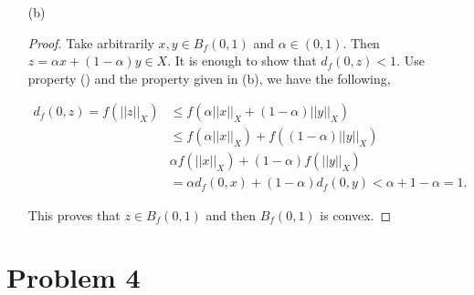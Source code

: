 \documentclass[12pt]{article}
\begin{document}
\begin{enumerate}
\begin{proof}
In conclusion, $(X, d_f)$ is a complete metric space.

\end{proof}

\item [(b)]

\begin{proof}

Take arbitrarily $x, y\in B_f(0, 1)$ and $\alpha\in(0, 1)$. Then $z = \alpha x + (1- \alpha)y\in X$. It is enough to show that $d_f(0, z) < 1$. Use property () and the property given in (b), we have the following,

$$
\begin{aligned}
d_f(0, z) = f(||z||_X) & \leqslant f(\alpha||x||_X + (1-\alpha)||y||_X) \\
& \leqslant f(\alpha||x||_X) + f((1-\alpha)||y||_X) \\
& \alpha f(||x||_X) + (1-\alpha)f(||y||_X)\\
& = \alpha d_f(0, x) + (1-\alpha) d_f(0, y) < \alpha + 1 - \alpha = 1.
\end{aligned}
$$ 

This proves that $z \in B_f(0,1)$ and then $B_f(0, 1)$ is convex.


\end{proof}


\end{enumerate}


\section*{Problem 4}
\end{document}
